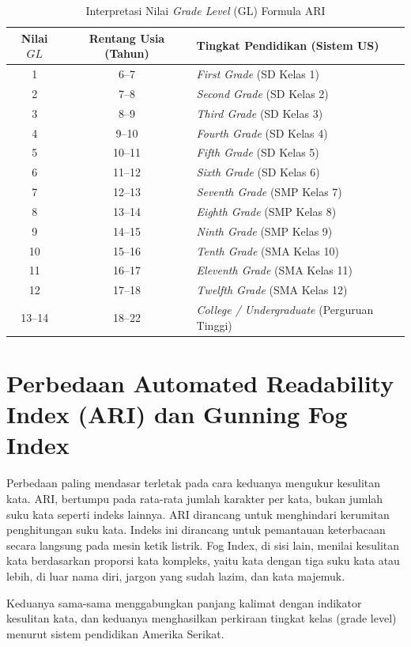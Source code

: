 \begin{table}[h!]
\centering
\caption{Interpretasi Nilai \textit{Grade Level} (GL) Formula ARI \cite{smith1967automated}}
\label{tab:interpretasi_ari}
\begin{tabular}{|c|c|l|}
\hline
\textbf{Nilai $GL$} & \textbf{Rentang Usia (Tahun)} & \textbf{Tingkat Pendidikan (Sistem US)} \\ \hline
1 & 6--7 & \textit{First Grade} (SD Kelas 1) \\ \hline
2 & 7--8 & \textit{Second Grade} (SD Kelas 2) \\ \hline
3 & 8--9 & \textit{Third Grade} (SD Kelas 3) \\ \hline
4 & 9--10 & \textit{Fourth Grade} (SD Kelas 4) \\ \hline
5 & 10--11 & \textit{Fifth Grade} (SD Kelas 5) \\ \hline
6 & 11--12 & \textit{Sixth Grade} (SD Kelas 6) \\ \hline
7 & 12--13 & \textit{Seventh Grade} (SMP Kelas 7) \\ \hline
8 & 13--14 & \textit{Eighth Grade} (SMP Kelas 8) \\ \hline
9 & 14--15 & \textit{Ninth Grade} (SMP Kelas 9) \\ \hline
10 & 15--16 & \textit{Tenth Grade} (SMA Kelas 10) \\ \hline
11 & 16--17 & \textit{Eleventh Grade} (SMA Kelas 11) \\ \hline
12 & 17--18 & \textit{Twelfth Grade} (SMA Kelas 12) \\ \hline
13--14 & 18--22 & \textit{College / Undergraduate} (Perguruan Tinggi) \\ \hline
\end{tabular}
\end{table}


\section{Perbedaan Automated Readability Index (ARI) dan Gunning Fog Index}
Perbedaan paling mendasar terletak pada cara keduanya mengukur kesulitan kata. ARI, bertumpu pada rata-rata jumlah karakter per kata, bukan jumlah suku kata seperti indeks lainnya. ARI dirancang untuk menghindari kerumitan penghitungan suku kata. Indeks ini dirancang untuk pemantauan keterbacaan secara langsung pada mesin ketik listrik. Fog Index, di sisi lain, menilai kesulitan kata berdasarkan proporsi kata kompleks, yaitu kata dengan tiga suku kata atau lebih, di luar nama diri, jargon yang sudah lazim, dan kata majemuk.

Keduanya sama-sama menggabungkan panjang kalimat dengan indikator kesulitan kata, dan keduanya menghasilkan perkiraan tingkat kelas (grade level) menurut sistem pendidikan Amerika Serikat. 